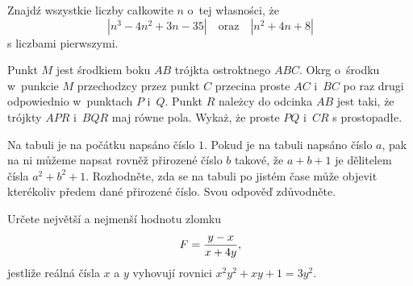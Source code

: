 {%
Znajdź wszystkie liczby ca\l{}kowite $n$ o~tej w\l{}asności, że
$$
|n^3-4n^2+3n-35|\quad\text{oraz}\quad |n^2+4n+8|
$$
s\ą{} liczbami pierwszymi.}

{%
Punkt $M$ jest środkiem boku $AB$ trójk\ą{}ta ostrok\ą{}tnego $ABC$. Okr\ą{}g o~środku w~punkcie $M$ przechodz\ą{}cy przez punkt $C$ przecina proste $AC$ i~$BC$ po raz drugi odpowiednio w~punktach $P$ i~$Q$. Punkt $R$ należ\ą{}cy do odcinka $AB$ jest taki, że trójk\ą{}ty $APR$ i~$BQR$ maj\ą{} równe pola. Wykaż, że proste $PQ$ i~$CR$ s\ą{} prostopad\l{}e.}

{%
Na tabuli je na počátku napsáno číslo $1$. Pokud je na tabuli napsáno číslo $a$, pak na ni můžeme napsat rovněž přirozené číslo $b$ takové, že $a+b+1$ je dělitelem čísla $a^2+b^2+1$. Rozhodněte, zda se na tabuli po jistém čase může objevit kterékoliv předem dané přirozené číslo. Svou odpověď zdůvodněte.
}

{%
Určete největší a nejmenší hodnotu zlomku
   $$F={{y-x}\over{x+4y}},$$
jestliže reálná čísla $x$ a $y$ vyhovují rovnici $x^2y^2+xy+1=3y^2$.
}
